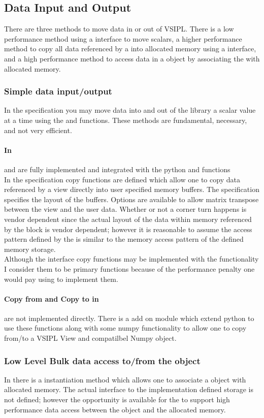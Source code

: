 \subsection{Data Input and Output}
There are three methods to move data in or out of VSIPL. There is a low performance method using a \vw{} interface to move scalars, a higher performance method to copy all data referenced by a \vw{} into  allocated memory using a \vw{} interface, and a high performance method to access data in a \Blk{} object by associating the \blk{} with  allocated memory.
\subsubsection{Simple data input/output}
In the \cvl{} specification you may move data into and out of the library a scalar value at a time using the  and  functions. These methods are fundamental, necessary, and not very efficient.
\paragraph{In \pyjv{}}  and  are fully implemented and integrated with the python  and  functions
\\[6pt]
In the \cvl{} specification copy functions are defined which allow one to copy data referenced by a view directly into user specified memory buffers.  The \cvl{} specification specifies the layout of the buffers. Options are available to allow matrix transpose between the view and the user data.  Whether or not a corner turn happens is vendor dependent since the actual layout of the data within memory referenced by the block is vendor dependent; however it is reasonable to assume the \blk{} access pattern defined by the \vw{} is similar to the memory access pattern of the  defined memory storage.
\\[6pt]
Although the interface copy functions may be implemented with the  functionality I consider them to be primary functions because of the performance penalty one would pay using  to implement them.
\paragraph{Copy from and Copy to in \pyjv{}} are not implemented directly.  There is a add on module which extend python to use these functions along with some numpy functionality to allow one to copy from/to a VSIPL View and compatilbel Numpy object.
\subsubsection{Low Level Bulk data access to/from the \blk{} object}
In \cvl{} there is a \blk{} instantiation method which allows one to associate a \Blk{} object with  allocated memory.  The actual interface to the implementation defined \Blk{} storage is not defined; however the opportunity is available for the  to support high performance data access between the \Blk{} object and the  allocated  memory.
%
